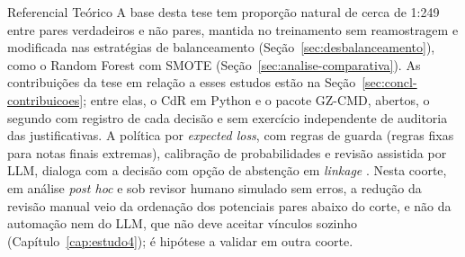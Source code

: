 \begin{chapter}{Referencial Teórico}
A base desta tese tem proporção natural de cerca de 1:249 entre pares verdadeiros e não pares, mantida no treinamento sem reamostragem e modificada nas estratégias de balanceamento (Seção~\ref{sec:desbalanceamento}), como o Random Forest com SMOTE (Seção~\ref{sec:analise-comparativa}). As contribuições da tese em relação a esses estudos estão na Seção~\ref{sec:concl-contribuicoes}; entre elas, o CdR em Python e o pacote GZ-CMD, abertos, o segundo com registro de cada decisão e sem exercício independente de auditoria das justificativas. A política por \textit{expected loss}, com regras de guarda (regras fixas para notas finais extremas), calibração de probabilidades e revisão assistida por LLM, dialoga com a decisão com opção de abstenção em \textit{linkage} \cite{Sadinle2017}. Nesta coorte, em análise \textit{post hoc} e sob revisor humano simulado sem erros, a redução da revisão manual veio da ordenação dos potenciais pares abaixo do corte, e não da automação nem do LLM, que não deve aceitar vínculos sozinho (Capítulo~\ref{cap:estudo4}); é hipótese a validar em outra coorte.


\end{chapter}

